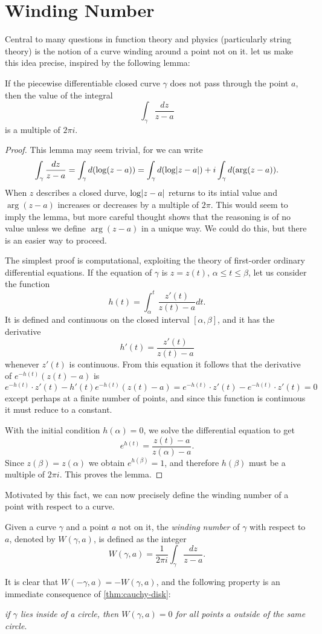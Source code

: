 \section{Winding Number}
Central to many questions in function theory and physics (particularly string theory) is the notion of a curve winding around a point not on it. let us make this idea precise, inspired by the following lemma:
\begin{lemma}
If the piecewise differentiable closed curve $\gamma$ does not pass through the point $a$, then the value of the integral $$\int_{\gamma} \dfrac{dz}{z-a}$$ is a multiple of $2\pi i$.
\end{lemma}
\begin{proof}
This lemma may seem trivial, for we can write $$\int_{\gamma}\dfrac{dz}{z-a}=\int_{\gamma} d(\log(z-a))=\int_{\gamma}d(\log \lvert z-a \rvert)+i\int_{\gamma}d(\arg(z-a)).$$ When $z$ describes a closed durve, $\log\lvert z-a \rvert$ returns to its intial value and $\arg(z-a)$ increases or decreases by a multiple of $2\pi$. This would seem to imply the lemma, but more careful thought shows that the reasoning is of no value unless we define $\arg(z-a)$ in a unique way. We could do this, but there is an easier way to proceed.

The simplest proof is computational, exploiting the theory of first-order ordinary differential equations. If the equation of $\gamma$ is $z=z(t)$, $\alpha \le t \le \beta$, let us consider the function $$h(t)=\int_{\alpha}^{t}\dfrac{z'(t)}{z(t)-a}dt.$$ It is defined and continuous on the closed interval $[\alpha, \beta]$, and it has the derivative $$h'(t)=\dfrac{z'(t)}{z(t)-a}$$ whenever $z'(t)$ is continuous. From this equation it follows that the derivative of $e^{-h(t)}(z(t)-a)$ is $$e^{-h(t)} \cdot z'(t)-h'(t)e^{-h(t)}(z(t)-a)=e^{-h(t)} \cdot z'(t)-e^{-h(t)} \cdot z'(t)=0$$ except perhaps at a finite number of points, and since this function is continuous it must reduce to a constant.

With the initial condition $h(\alpha)=0$, we solve the differential equation to get $$e^{h(t)}=\dfrac{z(t)-a}{z(\alpha)-a}.$$ Since $z(\beta)=z(\alpha)$ we obtain $e^{h(\beta)}=1$, and therefore $h(\beta)$ must be a multiple of $2\pi i$. This proves the lemma.
\end{proof}

Motivated by this fact, we can now precisely define the winding number of a point with respect to a curve.

\begin{definition}
Given a curve $\gamma$ and a point $a$ not on it, the \emph{winding number} of $\gamma$ with respect to $a$, denoted by $W(\gamma, a)$, is defined as the integer $$W(\gamma, a)=\frac{1}{2\pi i}\int_{\gamma} \dfrac{dz}{z-a}.$$
\end{definition}

It is clear that $W(-\gamma, a)=-W(\gamma, a)$, and the following property is an immediate consequence of \ref{thm:cauchy-disk}:

\textit{if $\gamma$ lies inside of a circle, then $W(\gamma,a)=0$ for all points $a$ outside of the same circle}.
